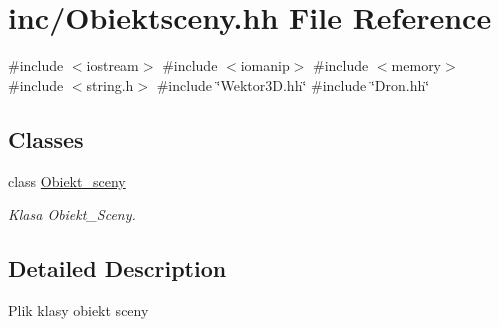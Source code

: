 \hypertarget{_obiektsceny_8hh}{}\section{inc/\+Obiektsceny.hh File Reference}
\label{_obiektsceny_8hh}
{\ttfamily \#include $<$iostream$>$}\newline
{\ttfamily \#include $<$iomanip$>$}\newline
{\ttfamily \#include $<$memory$>$}\newline
{\ttfamily \#include $<$string.\+h$>$}\newline
{\ttfamily \#include \char`\"{}Wektor3\+D.\+hh\char`\"{}}\newline
{\ttfamily \#include \char`\"{}Dron.\+hh\char`\"{}}\newline
\subsection*{Classes}
\begin{DoxyCompactItemize}
\item 
class \mbox{\hyperlink{class_obiekt__sceny}{Obiekt\+\_\+sceny}}
\begin{DoxyCompactList}\small\item\em Klasa Obiekt\+\_\+\+Sceny. \end{DoxyCompactList}\end{DoxyCompactItemize}


\subsection{Detailed Description}
Plik klasy obiekt sceny 